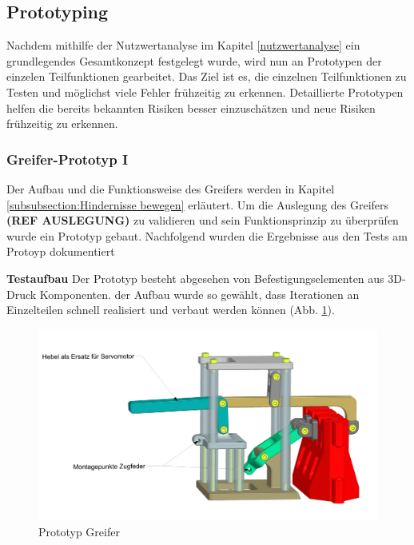 \subsection{Prototyping}

Nachdem mithilfe der Nutzwertanalyse im Kapitel \ref{nutzwertanalyse} ein grundlegendes Gesamtkonzept festgelegt wurde, wird nun an Prototypen der einzelen Teilfunktionen gearbeitet. Das Ziel ist es, die einzelnen Teilfunktionen zu Testen und möglichst viele Fehler frühzeitig zu erkennen. Detaillierte Prototypen helfen die bereits bekannten Risiken besser einzuschätzen und neue Risiken frühzeitig zu erkennen.

\subsubsection{Greifer-Prototyp I}
\label{subsubsection:gripper-prototype-1}


Der Aufbau und die Funktionsweise des Greifers werden in Kapitel \ref{subsubsection:Hindernisse bewegen} erläutert. Um die Auslegung des Greifers \textbf{(REF AUSLEGUNG)} zu validieren und sein Funktionsprinzip zu überprüfen wurde ein Prototyp gebaut. Nachfolgend wurden die Ergebnisse aus den Tests am Protoyp dokumentiert

\textbf{Testaufbau}
 Der Prototyp besteht abgesehen von Befestigungselementen aus 3D-Druck Komponenten. der Aufbau wurde so gewählt, dass Iterationen an Einzelteilen schnell realisiert und verbaut werden können (Abb. \ref{fig:gripper-prototype-trimetric-notes}). 

\begin{figure}[H]
\centering
\includegraphics[width=1.0\textwidth]{assets/greifer-prototyp/Greifer_Trimetrisch_Notes.png}
\caption{Prototyp Greifer}
\label{fig:gripper-prototype-trimetric-notes}
\end{figure}

